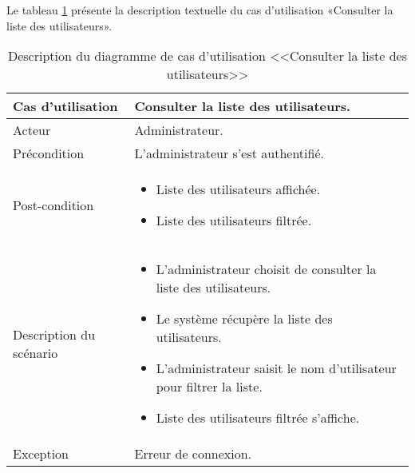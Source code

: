     Le tableau \ref{tab:consulterCompteUtilisateur} présente la description textuelle du cas d’utilisation «Consulter la liste des utilisateurs».
\begin{longtable}[c]{
    |p{}
    |p{}|
}
    \caption{Description du diagramme de cas d’utilisation <<Consulter la liste des utilisateurs>>}
    \label{tab:consulterCompteUtilisateur}\\
    \hline
    
    Cas d’utilisation
    &  Consulter la liste des utilisateurs. \\
    \hline 
    
    Acteur
    & Administrateur. \\
    \hline 
    
    Précondition
    & L’administrateur s’est authentifié. \\
    \hline
    
    Post-condition
    &     \begin{itemize}
    \item Liste des utilisateurs affichée.
     \item Liste des utilisateurs filtrée.
    \end{itemize} \\
    \hline
    
    Description du
scénario

    &      \begin{itemize}
    \item L’administrateur choisit de consulter la liste des utilisateurs.
    \item Le système récupère la liste des utilisateurs.
     \item L’administrateur saisit le nom d'utilisateur pour filtrer la liste.
     \item Liste des utilisateurs filtrée s'affiche.
    \end{itemize}  \\
    \hline
    
   Exception
    & Erreur de connexion.
 \\ \hline
   
\end{longtable}

